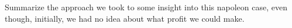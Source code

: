 \begin{exercise}
   Summarize the approach we took to some insight into this napoleon
   case, even though, initially, we had no idea about what profit we
   could make.
   \begin{comment}
Conclusion.
  \begin{itemize}
  \item Determine/estimate relation between demand (distribution) and sales price
  \item Make plots of the profit $Z$ as a function of $Q$, the demand
    distribution, and the sales price.
  \item Choose a $Q$ that makes sense. The existence of an optimal $Q$
    is a \emph{delusion}.
  \item Be aware that salesforce may predict too high demand. They get insentives to sell much, but they are not responsible for overage cost!
  \end{itemize}
   \end{comment}
 \end{exercise}



